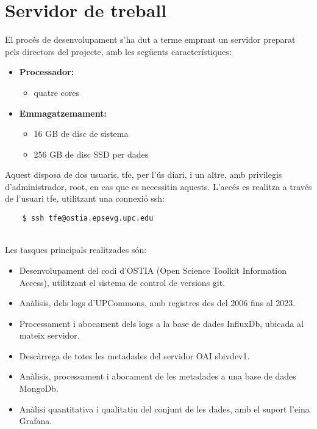 \chapter{Servidor de treball}\label{ch:server-description}


El procés de desenvolupament s’ha dut a terme emprant un servidor preparat pels directors del projecte, amb les següents característiques:

\begin{itemize}
    \item \textbf{Processador:}
    \begin{itemize}
        \item quatre cores
    \end{itemize}
    \item \textbf{Emmagatzemament:}
    \begin{itemize}
        \item 16 GB de disc de sistema
        \item 256 GB de disc SSD per dades
    \end{itemize}
\end{itemize}

\noindent
Aquest disposa de dos usuaris, tfe, per l’ús diari, i un altre, amb privilegis d’administrador, root, en cas que es necessitin aquests.
L’accés es realitza a través de l’usuari tfe, utilitzant una connexió ssh:

\begin{verbatim}
    $ ssh tfe@ostia.epsevg.upc.edu
\end{verbatim}

\noindent
\\ Les tasques principals realitzades són:

\begin{itemize}
    \item Desenvolupament del codi d’OSTIA (Open Science Toolkit Information Access), utilitzant el sistema de control de versions git.
    \item Anàlisis, dels logs d’UPCommons, amb registres des del 2006 fins al 2023.
    \item Processament i abocament dels logs a la base de dades InfluxDb, ubicada al mateix servidor.
    \item Descàrrega de totes les metadades del servidor OAI sbivdev1.
    \item Anàlisis, processament i abocament de les metadades a una base de dades MongoDb.
    \item Anàlisi quantitativa i qualitatiu del conjunt de les dades, amb el suport l’eina Grafana.
\end{itemize}

